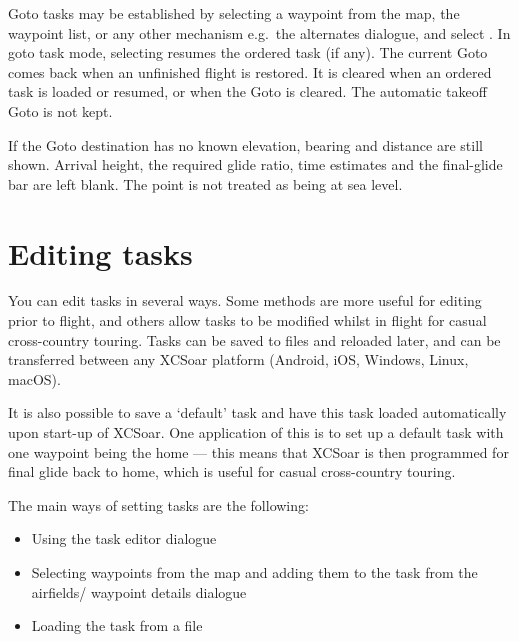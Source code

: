Goto tasks may be established by selecting a waypoint from the map,
the waypoint list, or any other mechanism e.g.\ the alternates dialogue,
and select . In goto task mode, selecting
\blink{} resumes the ordered task (if
any). The current Goto comes back when an unfinished flight is
restored. It is cleared when
an ordered task is loaded or resumed, or when the Goto is cleared.
The automatic takeoff Goto is not kept.

If the Goto destination has no known elevation, bearing and distance
are still shown. Arrival height, the required glide ratio, time
estimates and the final-glide bar are left blank. The point is not
treated as being at sea level.

\section{Editing tasks}

You can edit tasks in several ways.  Some methods are more useful for
editing prior to flight, and others allow tasks to be modified whilst
in flight for casual cross-country touring.  Tasks can be saved to
files and reloaded later, and can be transferred between any XCSoar
platform (Android, iOS, Windows, Linux, macOS\textellipsis).

\tip{} It is also possible to save a `default' task and have this task loaded
automatically upon start-up of XCSoar.  One application of this is to
set up a default task with one waypoint being the home --- this means
that XCSoar is then programmed for final glide back to home, which is
useful for casual cross-country touring.

The main ways of setting tasks are the following:
\begin{itemize}
\item Using the task editor dialogue
\item Selecting waypoints from the map and adding them to the task from the
 airfields/ waypoint details dialogue
\item Loading the task from a file
\end{itemize}

%

